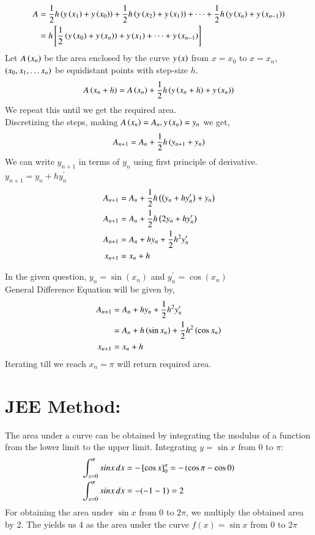 \documentclass[journal]{IEEEtran}
\begin{document}
\begin{align}
    A&=\frac{1}{2}h\left(y\left(x_1\right)+y\left(x_0\right)\right)+ \frac{1}{2}h\left(y\left(x_2\right)+y\left(x_1\right)\right)+\dots+\frac{1}{2}h\left(y\left(x_n\right)+y\left(x_{n-1}\right)\right)\\
  &=h{}\left[\frac{1}{2}\left(y\left(x_0\right)+y\left(x_n\right)\right)+ y\left(x_1\right)+\dots+y\left(x_{n-1}\right)\right]
\end{align}
Let $A\left(x_n\right)$ be the area enclosed by the curve $y\left(x\right)$ from $x=x_0$ to $x=x_n$, $\left(x_0, x_1, \dots x_n\right)$ be equidistant points with step-size $h$.
\begin{align}
  A\left(x_n+h\right)=A\left(x_n\right)+\frac{1}{2}h\left(y\left(x_n+h\right)+y\left(x_n\right)\right)
\end{align}
We repeat this until we get the required area.\\
Discretizing the steps, making $A\left(x_n\right)=A_n, y\left(x_n\right)=y_n$ we get,
\begin{align}
 A_{n+1}=A_n+\frac{1}{2}h\left(y_{n+1}+y_n\right)
\end{align}
We can write $y_{n+1}$ in terms of $y_n$ using first principle of derivative. $y_{n+1}=y_n+hy^{\prime}_n$
\begin{align}
  A_{n+1}&=A_n+\frac{1}{2}h\left(\left(y_{n}+hy^{\prime}_n\right)+y_n\right)\\
  A_{n+1}&=A_n+\frac{1}{2}h\left(2y_n+hy^{\prime}_n\right)\\
  A_{n+1}&=A_n+hy_n+\frac{1}{2}h^2y^{\prime}_n\\
  x_{n+1}&=x_n+h
\end{align}

In the given question, $y_n=\sin{(x_n)}$ and $y^{\prime}_n=\cos{(x_n)}$\\
General Difference Equation will be given by,
\begin{align}
  A_{n+1}&=A_n+hy_n+\frac{1}{2}h^2y^{\prime}_n\\
  &=A_n+h\left(\sin{x_n}\right)+\frac{1}{2}h^2\left(\cos{x_n}\right)\\
  x_{n+1}&=x_n+h
\end{align}
Iterating till we reach $x_n=\pi$ will return required area.\\
\section*{JEE Method:}
The area under a curve can be obtained by integrating the modulus of a function from the lower limit to the upper limit.
Integrating $y=\sin{x}$ from $0$ to $\pi$:
\begin{align}
\int_{x=0}^{\pi}sin{x}\,dx &= -{}\left[\cos{x}\right]_{0}^{\pi}=-\left(\cos{\pi}-\cos{0}\right)\\
\int_{x=0}^{\pi}sin{x}\,dx &=-(-1-1)=2
\end{align}
For obtaining the area under $\sin{x}$ from $0$ to $2\pi$, we multiply the obtained area by 2.
The yields us 4 as the area under the curve $f(x)=\sin{x}$ from $0$ to $2\pi$
\end{document}
